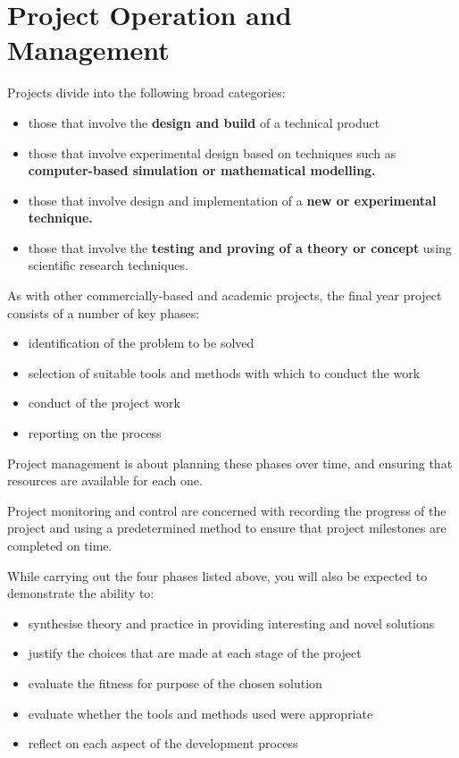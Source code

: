 \chapter{Project Operation and Management}

Projects divide into the following broad categories:

\begin{itemize}
    \item those that involve the \textbf{design and build} of a technical product
    \item those that involve experimental design based on techniques such as \textbf{computer-based simulation or mathematical modelling.}
    \item those that involve design and implementation of a \textbf{new or experimental technique.}
    \item those that involve the \textbf{testing and proving of a theory or concept} using scientific research techniques. 
\end{itemize}

As with other commercially-based and academic projects, the final year project consists of a number of key phases: 

\begin{itemize}
    \item identification of the problem to be solved
    \item selection of suitable tools and methods with which to conduct the work
    \item conduct of the project work
    \item reporting on the process
\end{itemize}

Project management is about planning these phases over time, and ensuring that resources are available for each one.

Project monitoring and control are concerned with recording the progress of the project and using a predetermined method to ensure that project milestones are completed on time.

While carrying out the four phases listed above, you will also be expected to demonstrate the ability to:

\begin{itemize}
    \item synthesise theory and practice in providing interesting and novel solutions
    \item justify the choices that are made at each stage of the project
    \item evaluate the fitness for purpose of the chosen solution
    \item evaluate whether the tools and methods used were appropriate
    \item reflect on each aspect of the development process
\end{itemize}

